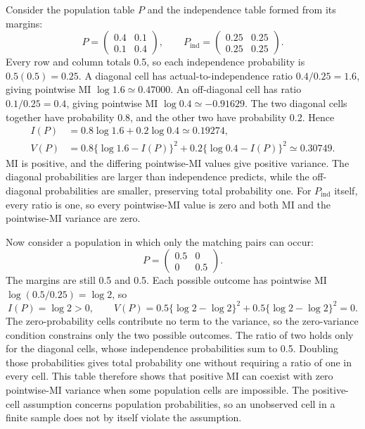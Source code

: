 Consider the population table \(P\) and the independence table formed
from its margins:
\begin{equation}
 P=\begin{pmatrix}0.4&0.1\\0.1&0.4\end{pmatrix},
 \qquad
 P_{\mathrm{ind}}=\begin{pmatrix}0.25&0.25\\0.25&0.25\end{pmatrix}.
\end{equation}
Every row and column totals 0.5, so each independence probability is
\(0.5(0.5)=0.25\). A diagonal cell has actual-to-independence ratio
\(0.4/0.25=1.6\), giving pointwise MI \(\log1.6\simeq0.47000\).
An off-diagonal cell has ratio \(0.1/0.25=0.4\), giving pointwise MI
\(\log0.4\simeq-0.91629\). The two diagonal cells together have
probability 0.8, and the other two have probability 0.2. Hence
\begin{align}
 I(P)&=0.8\log1.6+0.2\log0.4\simeq0.19274,\\
 V(P)&=0.8\{\log1.6-I(P)\}^2
       +0.2\{\log0.4-I(P)\}^2\simeq0.30749.
\end{align}
MI is positive, and the differing pointwise-MI values give positive
variance. The diagonal probabilities are larger than independence
predicts, while the off-diagonal probabilities are smaller, preserving
total probability one. For \(P_{\mathrm{ind}}\) itself, every ratio
is one, so every pointwise-MI value is zero and both MI and the
pointwise-MI variance are zero.

\medskip
{}

Now consider a population in which only the matching pairs can occur:
\begin{equation}
 P=\begin{pmatrix}0.5&0\\0&0.5\end{pmatrix}.
\end{equation}
The margins are still 0.5 and 0.5. Each possible outcome has pointwise
MI \(\log(0.5/0.25)=\log2\), so
\begin{equation}
 I(P)=\log2>0,
 \qquad
 V(P)=0.5\{\log2-\log2\}^2
      +0.5\{\log2-\log2\}^2=0.
\end{equation}
The zero-probability cells contribute no term to the variance, so the
zero-variance condition constrains only the two possible outcomes. The
ratio of two holds only for the diagonal cells, whose independence probabilities sum
to 0.5. Doubling those probabilities gives total probability one without
requiring a ratio of one in every cell. This table therefore shows that
positive MI can coexist with zero pointwise-MI variance when some
population cells are impossible. The positive-cell assumption concerns
population probabilities, so an unobserved cell in a finite sample does
not by itself violate the assumption.
